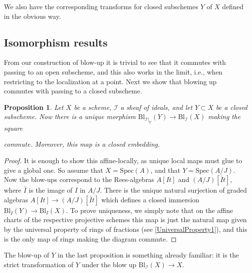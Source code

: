 \documentclass[12pt,a4paper,leqno]{article}
\newcommand{\spec}{\mathrm{Spec}}
\newcommand{\bl}{\mathrm{Bl}}
\newcommand{\fref}[1]{\hyperref[{#1}]{\ref*{#1}}}
\theoremstyle{plain}
\newtheorem{prop}[theo]{Proposition}
\theoremstyle{definition}
\theoremstyle{remark}
\begin{document}
We also have the corresponding transforms for closed subschemes $Y$ of $X$ defined in the obvious way.

\subsection{Isomorphism results}

From our construction of blow-up it is trivial to see that it commutes with passing to an open subscheme, and this also works in the limit, i.e., when restricting to the localization at a point. Next we show that blowing up commutes with passing to a closed subscheme.

\begin{prop}\label{BlowUpCommutesWithClosedEmbeddings}
Let $X$ be a scheme, $\mathscr{I}$ a sheaf of ideals, and let $Y \subset X$ be a closed subscheme. Now there is a unique morphism $\bl_{\mathscr{I}|_Y}(Y) \to \bl_{\mathscr{I}}(X)$ making the square
\begin{center}
\end{center}
commute. Moreover, this map is a closed embedding.
\end{prop}
\begin{proof}
It is enough to show this affine-locally, as unique local maps must glue to give a global one. So assume that $X = \spec (A)$, and that $Y = \spec (A/J)$. Now the blow-ups correspond to the Rees-algebras $A[It]$ and $(A/J)[\bar{I}t]$, where $\bar I$ is the image of $I$ in $A/J$. There is the unique natural surjection of graded algebras $A[It] \to (A/J)[\bar{I}t]$ which defines a closed immersion $\bl_{\bar{I}} (Y) \to \bl_I (X)$. To prove uniqueness, we simply note that on the affine charts of the respective projective schemes this map is just the natural map given by the universal property of rings of fractions (see \fref{UniversalProperty1}), and this is the only map of rings making the diagram commute.
\end{proof}

The blow-up of $Y$ in the last proposition is something already familiar: it is the strict transformation of $Y$ under the blow up $\bl_{\mathscr{I}} (X) \to X$. 
\end{document}
